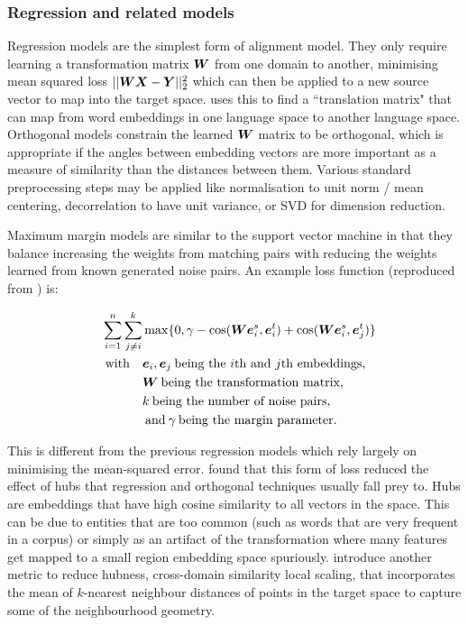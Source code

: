 \subsubsection{Regression and related models}

Regression models are the simplest form of alignment model. They only require learning a transformation matrix $\boldsymbol{W}$ from one domain to another, minimising mean squared loss $|| \boldsymbol{W} \boldsymbol{X} - \boldsymbol{Y}||_2^2$ which can then be applied to a new source vector to map into the target space. \cite{MikolovMachineTranslation} uses this to find a ``translation matrix" that can map from word embeddings in one language space to another language space. Orthogonal models constrain the learned $\boldsymbol{W}$ matrix to be orthogonal, which is appropriate if the angles between embedding vectors are more important as a measure of similarity than the distances between them. Various standard preprocessing steps may be applied like normalisation to unit norm / mean centering, decorrelation to have unit variance, or SVD for dimension reduction.

Maximum margin models are similar to the support vector machine \cite{SVM} in that they balance increasing the weights from matching pairs with reducing the weights learned from known generated noise pairs. An example loss function (reproduced from \cite{kalinowski2020survey}) is:

\begin{equation}
\begin{split}
\sum_{i=1}^n \sum_{j \neq i}^{k} &\max \{0, \gamma - \cos(\boldsymbol{W} \boldsymbol{e}_i^s, \boldsymbol{e}_i^t) + \cos(\boldsymbol{W} \boldsymbol{e}_i^s, \boldsymbol{e}_j^t)\}\\
\quad \text{with} \quad& \boldsymbol{e}_i, \boldsymbol{e}_j \medspace \text{being the $i$th and $j$th embeddings},\\
& \boldsymbol{W} \medspace \text{being the transformation matrix},\\
& k \medspace \text{being the number of noise pairs}, \\
& \medspace \text{and}\medspace \gamma \medspace \text{being the margin parameter}.
\end{split}
\end{equation}

This is different from the previous regression models which rely largely on minimising the mean-squared error. \cite{Hubness} found that this form of loss reduced the effect of hubs that regression and orthogonal techniques usually fall prey to. Hubs are embeddings that have high cosine similarity to all vectors in the space. This can be due to entities that are too common (such as words that are very frequent in a corpus) or simply as an artifact of the transformation where many features get mapped to a small region embedding space spuriously. \cite{ImprovingSupervisedBilingualMapping} introduce another metric to reduce hubness, cross-domain similarity local scaling, that incorporates the mean of $k$-nearest neighbour distances of points in the target space to capture some of the neighbourhood geometry. 

